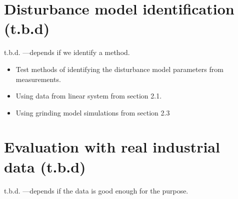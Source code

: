 \section{Disturbance model identification (t.b.d)}

t.b.d. —depends if we identify a method.

\begin{itemize}
	\item Test methods of identifying the disturbance model parameters from measurements.
	\item Using data from linear system from section 2.1.
	\item Using grinding model simulations from section 2.3 
\end{itemize}

\section{Evaluation with real industrial data (t.b.d)}

t.b.d. —depends if the data is good enough for the purpose.
